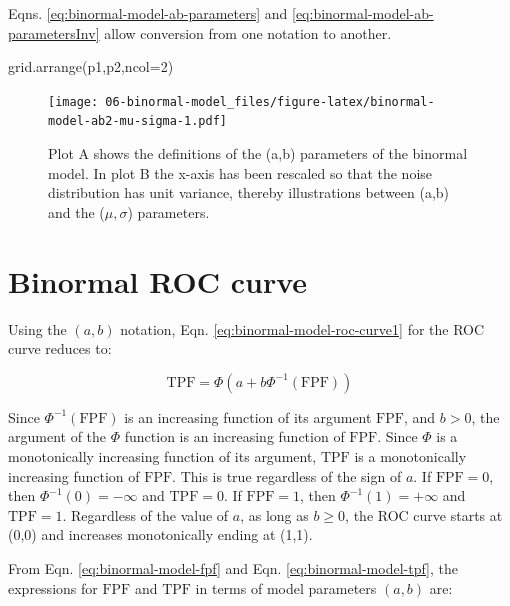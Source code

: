 \documentclass[
]{book}
\newenvironment{Shaded}{\begin{snugshade}}{\end{snugshade}}
\newcommand{\AttributeTok}[1]{\textcolor[rgb]{0.77,0.63,0.00}{#1}}
\newcommand{\DecValTok}[1]{\textcolor[rgb]{0.00,0.00,0.81}{#1}}
\newcommand{\FunctionTok}[1]{\textcolor[rgb]{0.00,0.00,0.00}{#1}}
\newcommand{\NormalTok}[1]{#1}
\begin{document}
Eqns. \eqref{eq:binormal-model-ab-parameters} and \eqref{eq:binormal-model-ab-parametersInv} allow conversion from one notation to another.

\begin{Shaded}
\begin{Highlighting}[]
\FunctionTok{grid.arrange}\NormalTok{(p1,p2,}\AttributeTok{ncol=}\DecValTok{2}\NormalTok{)}
\end{Highlighting}
\end{Shaded}

\begin{figure}
\centering
\texttt{[image: 06-binormal-model\_files/figure-latex/binormal-model-ab2-mu-sigma-1.pdf]}
\caption{\label{fig:binormal-model-ab2-mu-sigma}Plot A shows the definitions of the (a,b) parameters of the binormal model. In plot B the x-axis has been rescaled so that the noise distribution has unit variance, thereby illustrations between (a,b) and the (\(\mu,\sigma\)) parameters.}
\end{figure}

\hypertarget{binormal-model-roc-curve}{%
\section{Binormal ROC curve}\label{binormal-model-roc-curve}}

Using the \((a,b)\) notation, Eqn. \eqref{eq:binormal-model-roc-curve1} for the ROC curve reduces to:

\begin{equation} 
\text{TPF} = \Phi\left ( a+ b \Phi^{-1}\left (\text{FPF}  \right ) \right )
\label{eq:binormal-model-roc-curve}
\end{equation}

Since \(\Phi^{-1}(\text{FPF})\) is an increasing function of its argument \(\text{FPF}\), and \(b > 0\), the argument of the \(\Phi\) function is an increasing function of \(\text{FPF}\). Since \(\Phi\) is a monotonically increasing function of its argument, \(\text{TPF}\) is a monotonically increasing function of \(\text{FPF}\). This is true regardless of the sign of \(a\). If \(\text{FPF} = 0\), then \(\Phi^{-1}(0) = -\infty\) and \(\text{TPF} = 0\). If \(\text{FPF} = 1\), then \(\Phi^{-1}(1) = +\infty\) and \(\text{TPF} = 1\). Regardless of the value of \(a\), as long as \(b \ge 0\), the ROC curve starts at (0,0) and increases monotonically ending at (1,1).

From Eqn. \eqref{eq:binormal-model-fpf} and Eqn. \eqref{eq:binormal-model-tpf}, the expressions for \(\text{FPF}\) and \(\text{TPF}\) in terms of model parameters \((a,b)\) are:
\end{document}
